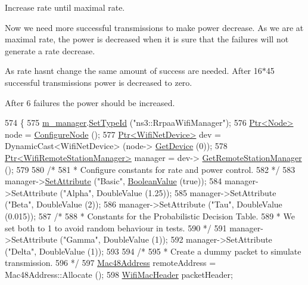 Increase rate until maximal rate.

Now we need more successful transmissions to make power decrease. As we are at maximal rate, the power is decreased when it is sure that the failures will not generate a rate decrease.

As rate hasn\textquotesingle{}t change the same amount of success are needed. After 16$\ast$45 successful transmissions power is decreased to zero.

After 6 failures the power should be increased.
\begin{DoxyCode}
574 \{
575   \hyperlink{classPowerRateAdaptationTest_afa9f7fb131c12b88efa24138930c50b3}{m\_manager}.\hyperlink{classns3_1_1ObjectFactory_a77dcd099064038a1eb7a6b8251229ec3}{SetTypeId} (\textcolor{stringliteral}{"ns3::RrpaaWifiManager"});
576   \hyperlink{classns3_1_1Ptr}{Ptr<Node>} node = \hyperlink{classPowerRateAdaptationTest_a498edc12eed6e91b38d1b71d4565a306}{ConfigureNode} ();
577   \hyperlink{classns3_1_1Ptr}{Ptr<WifiNetDevice>} dev = DynamicCast<WifiNetDevice> (node->
      \hyperlink{classns3_1_1Node_a5918dfd24ef632efc9a83a5f6561c76e}{GetDevice} (0));
578   \hyperlink{classns3_1_1Ptr}{Ptr<WifiRemoteStationManager>} manager = dev->
      \hyperlink{classns3_1_1WifiNetDevice_a8b8bb06504a6d76552dd626103b1e5fd}{GetRemoteStationManager} ();
579 
580   \textcolor{comment}{/*}
581 \textcolor{comment}{   * Configure constants for rate and power control.}
582 \textcolor{comment}{   */}
583   manager->\hyperlink{classns3_1_1ObjectBase_ac60245d3ea4123bbc9b1d391f1f6592f}{SetAttribute} (\textcolor{stringliteral}{"Basic"}, \hyperlink{classns3_1_1BooleanValue}{BooleanValue} (\textcolor{keyword}{true}));
584   manager->SetAttribute (\textcolor{stringliteral}{"Alpha"}, DoubleValue (1.25));
585   manager->SetAttribute (\textcolor{stringliteral}{"Beta"}, DoubleValue (2));
586   manager->SetAttribute (\textcolor{stringliteral}{"Tau"}, DoubleValue (0.015));
587   \textcolor{comment}{/*}
588 \textcolor{comment}{   * Constants for the Probabilistic Decision Table.}
589 \textcolor{comment}{   * We set both to 1 to avoid random behaviour in tests.}
590 \textcolor{comment}{   */}
591   manager->SetAttribute (\textcolor{stringliteral}{"Gamma"}, DoubleValue (1));
592   manager->SetAttribute (\textcolor{stringliteral}{"Delta"}, DoubleValue (1));
593 
594   \textcolor{comment}{/*}
595 \textcolor{comment}{   * Create a dummy packet to simulate transmission.}
596 \textcolor{comment}{   */}
597   \hyperlink{classns3_1_1Mac48Address}{Mac48Address} remoteAddress = Mac48Address::Allocate ();
598   \hyperlink{classns3_1_1WifiMacHeader}{WifiMacHeader} packetHeader;

\end{DoxyCode}

